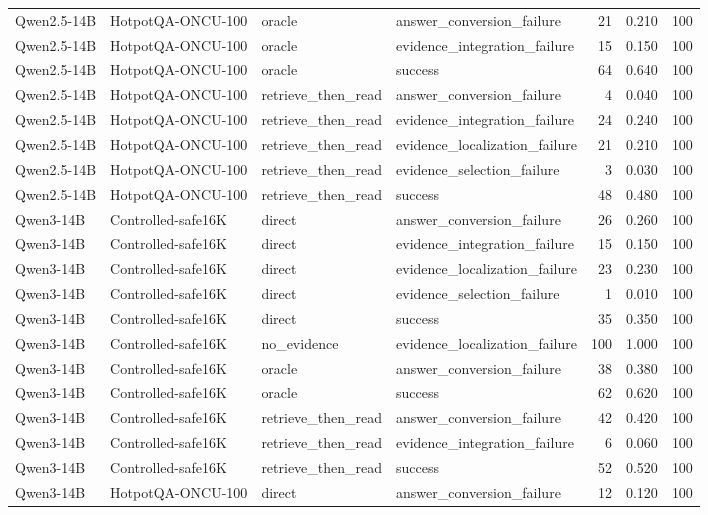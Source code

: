 \begin{tabular}{llllrrr}
Qwen2.5-14B & HotpotQA-ONCU-100 & oracle & answer_conversion_failure & 21 & 0.210 & 100 \\
Qwen2.5-14B & HotpotQA-ONCU-100 & oracle & evidence_integration_failure & 15 & 0.150 & 100 \\
Qwen2.5-14B & HotpotQA-ONCU-100 & oracle & success & 64 & 0.640 & 100 \\
Qwen2.5-14B & HotpotQA-ONCU-100 & retrieve_then_read & answer_conversion_failure & 4 & 0.040 & 100 \\
Qwen2.5-14B & HotpotQA-ONCU-100 & retrieve_then_read & evidence_integration_failure & 24 & 0.240 & 100 \\
Qwen2.5-14B & HotpotQA-ONCU-100 & retrieve_then_read & evidence_localization_failure & 21 & 0.210 & 100 \\
Qwen2.5-14B & HotpotQA-ONCU-100 & retrieve_then_read & evidence_selection_failure & 3 & 0.030 & 100 \\
Qwen2.5-14B & HotpotQA-ONCU-100 & retrieve_then_read & success & 48 & 0.480 & 100 \\
Qwen3-14B & Controlled-safe16K & direct & answer_conversion_failure & 26 & 0.260 & 100 \\
Qwen3-14B & Controlled-safe16K & direct & evidence_integration_failure & 15 & 0.150 & 100 \\
Qwen3-14B & Controlled-safe16K & direct & evidence_localization_failure & 23 & 0.230 & 100 \\
Qwen3-14B & Controlled-safe16K & direct & evidence_selection_failure & 1 & 0.010 & 100 \\
Qwen3-14B & Controlled-safe16K & direct & success & 35 & 0.350 & 100 \\
Qwen3-14B & Controlled-safe16K & no_evidence & evidence_localization_failure & 100 & 1.000 & 100 \\
Qwen3-14B & Controlled-safe16K & oracle & answer_conversion_failure & 38 & 0.380 & 100 \\
Qwen3-14B & Controlled-safe16K & oracle & success & 62 & 0.620 & 100 \\
Qwen3-14B & Controlled-safe16K & retrieve_then_read & answer_conversion_failure & 42 & 0.420 & 100 \\
Qwen3-14B & Controlled-safe16K & retrieve_then_read & evidence_integration_failure & 6 & 0.060 & 100 \\
Qwen3-14B & Controlled-safe16K & retrieve_then_read & success & 52 & 0.520 & 100 \\
Qwen3-14B & HotpotQA-ONCU-100 & direct & answer_conversion_failure & 12 & 0.120 & 100 \\

\end{tabular}
